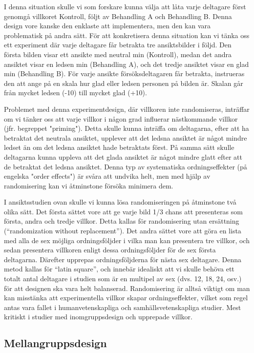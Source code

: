\documentclass[
]{book}
\begin{document}
I denna situation skulle vi som forskare kunna välja att låta varje deltagare först genomgå villkoret Kontroll, följt av Behandling A och Behandling B. Denna design vore kanske den enklaste att implementera, men den kan vara problematisk på andra sätt. För att konkretisera denna situation kan vi tänka oss ett experiment där varje deltagare får betrakta tre ansiktsbilder i följd. Den första bilden visar ett ansikte med neutral min (Kontroll), medan det andra ansiktet visar en ledsen min (Behandling A), och det tredje ansiktet visar en glad min (Behandling B). För varje ansikte försöksdeltagaren får betrakta, instrueras den att ange på en skala hur glad eller ledsen personen på bilden är. Skalan går från mycket ledsen (-10) till mycket glad (+10).

Problemet med denna experimentdesign, där villkoren inte randomiseras, inträffar om vi tänker oss att varje villkor i någon grad influerar nästkommande villkor (jfr. begreppet "priming"). Detta skulle kunna inträffa om deltagarna, efter att ha betraktat det neutrala ansiktet, upplever att det ledsna ansiktet är något mindre ledset än om det ledsna ansiktet hade betraktats först. På samma sätt skulle deltagarna kunna uppleva att det glada ansiktet är något mindre glatt efter att de betraktat det ledsna ansiktet. Denna typ av systematiska ordningseffekter (på engelska "order effects") är svåra att undvika helt, men med hjälp av randomisering kan vi åtminstone försöka minimera dem.

I ansiktsstudien ovan skulle vi kunna lösa randomiseringen på åtminstone två olika sätt. Det första sättet vore att ge varje bild 1/3 chans att presenteras som första, andra och tredje villkor. Detta kallas för randomisering utan ersättning (``randomization without replacement''). Det andra sättet vore att göra en lista med alla de sex möjliga ordningsföljder i vilka man kan presentera tre villkor, och sedan presentera villkoren enligt dessa ordningsföljder för de sex första deltagarna. Därefter upprepas ordningsföljderna för nästa sex deltagare. Denna metod kallas för ``latin square'', och innebär idealiskt att vi skulle behöva ett totalt antal deltagare i studien som är en multipel av sex (dvs. 12, 18, 24, osv.) för att designen ska vara helt balanserad. Randomisering är alltså viktigt om man kan misstänka att experimentella villkor skapar ordningseffekter, vilket som regel antas vara fallet i humanvetenskapliga och samhällsvetenskapliga studier. Mest kritiskt i studier med inomgruppsdesign och upprepade villkor.

\hypertarget{sub07.5.3}{%
\subsection{Mellangruppsdesign}\label{sub07.5.3}}
\end{document}
